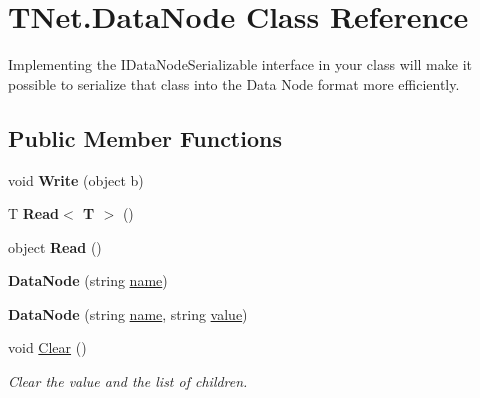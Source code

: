 \hypertarget{class_t_net_1_1_data_node}{}\section{T\+Net.\+Data\+Node Class Reference}
\label{class_t_net_1_1_data_node}


Implementing the I\+Data\+Node\+Serializable interface in your class will make it possible to serialize that class into the Data Node format more efficiently.  


\subsection*{Public Member Functions}
\begin{DoxyCompactItemize}
\item 
\mbox{\label{class_t_net_1_1_data_node_a189406ddb96cfd4cbd15b22a24977667}} 
void {\bfseries Write} (object b)
\item 
\mbox{\label{class_t_net_1_1_data_node_aeee3533c97576d333c7834e15613bb6d}} 
T {\bfseries Read$<$ T $>$} ()
\item 
\mbox{\label{class_t_net_1_1_data_node_a9c42a6522d4d605587559eefe84cedbc}} 
object {\bfseries Read} ()
\item 
\mbox{\label{class_t_net_1_1_data_node_a0117a34bdb3c03665d000abe26be1e04}} 
{\bfseries Data\+Node} (string \mbox{\hyperlink{class_t_net_1_1_data_node_aaf44a44fb25aad98dd115faf7607858c}{name}})
\item 
\mbox{\label{class_t_net_1_1_data_node_a4cd127bd7d2bd1b31025fd5f2b1a5511}} 
{\bfseries Data\+Node} (string \mbox{\hyperlink{class_t_net_1_1_data_node_aaf44a44fb25aad98dd115faf7607858c}{name}}, string \mbox{\hyperlink{class_t_net_1_1_data_node_ab1b718ef512ce7e5ebff5aa1a6c8e37b}{value}})
\item 
void \mbox{\hyperlink{class_t_net_1_1_data_node_a2b256944bcfce5d20366975fb5433db7}{Clear}} ()
\begin{DoxyCompactList}\small\item\em Clear the value and the list of children. \end{DoxyCompactList}\item 

\end{DoxyCompactItemize}

